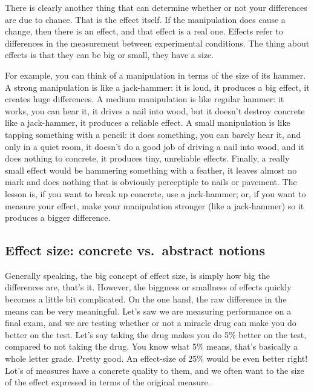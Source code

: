 \documentclass[
]{book}
\begin{document}
There is clearly another thing that can determine whether or not your differences are due to chance. That is the effect itself. If the manipulation does cause a change, then there is an effect, and that effect is a real one. Effects refer to differences in the measurement between experimental conditions. The thing about effects is that they can be big or small, they have a size.

For example, you can think of a manipulation in terms of the size of its hammer. A strong manipulation is like a jack-hammer: it is loud, it produces a big effect, it creates huge differences. A medium manipulation is like regular hammer: it works, you can hear it, it drives a nail into wood, but it doesn't destroy concrete like a jack-hammer, it produces a reliable effect. A small manipulation is like tapping something with a pencil: it does something, you can barely hear it, and only in a quiet room, it doesn't do a good job of driving a nail into wood, and it does nothing to concrete, it produces tiny, unreliable effects. Finally, a really small effect would be hammering something with a feather, it leaves almost no mark and does nothing that is obviously perceptiple to nails or pavement. The lesson is, if you want to break up concrete, use a jack-hammer; or, if you want to measure your effect, make your manipulation stronger (like a jack-hammer) so it produces a bigger difference.

\subsection{Effect size: concrete vs.~abstract notions}\label{effect-size-concrete-vs.-abstract-notions}

Generally speaking, the big concept of effect size, is simply how big the differences are, that's it. However, the biggness or smallness of effects quickly becomes a little bit complicated. On the one hand, the raw difference in the means can be very meaningful. Let's saw we are measuring performance on a final exam, and we are testing whether or not a miracle drug can make you do better on the test. Let's say taking the drug makes you do 5\% better on the test, compared to not taking the drug. You know what 5\% means, that's basically a whole letter grade. Pretty good. An effect-size of 25\% would be even better right! Lot's of measures have a concrete quality to them, and we often want to the size of the effect expressed in terms of the original measure.
\end{document}
